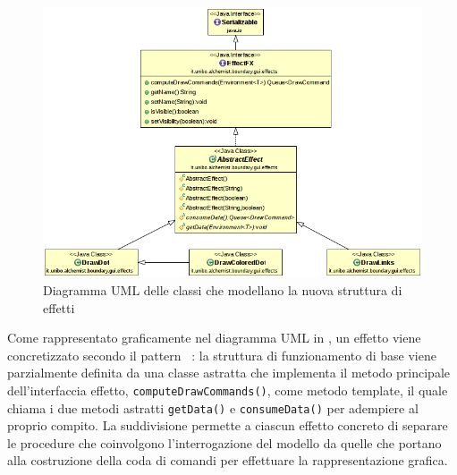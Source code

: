                 \begin{figure}[htbp]
                    \centering
                    \includegraphics[scale=0.5]{img/EffectFXUMLsimple}
                    \caption{Diagramma UML delle classi che modellano la nuova struttura di effetti%
                    }
                    \label{fig:effectFX}
                \end{figure}

                Come rappresentato graficamente nel diagramma UML in , un effetto viene concretizzato secondo il pattern ~\cite{templateMethod}: la struttura di funzionamento di base viene parzialmente definita da una classe astratta che implementa il metodo principale dell'interfaccia effetto, \texttt{computeDrawCommands()}, come metodo template, il quale chiama i due metodi astratti \texttt{getData()} e \texttt{consumeData()} per adempiere al proprio compito.
                La suddivisione permette a ciascun effetto concreto di separare le procedure che coinvolgono l'interrogazione del modello da quelle che portano alla costruzione della coda di comandi per effettuare la rappresentazione grafica.

